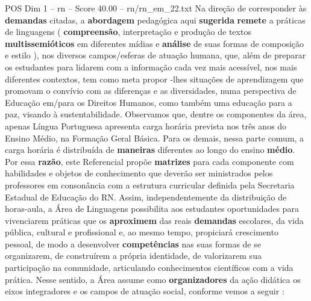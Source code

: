 \begin{textsample}{POS Dim 1 – rn – Score 40.00 – rn/rn\_em\_22.txt}
Na direção de corresponder às \textbf{demandas} citadas, a \textbf{abordagem} pedagógica aqui \textbf{sugerida} \textbf{remete} a práticas de linguagens ( \textbf{compreensão}, interpretação e produção de textos \textbf{multissemióticos} em diferentes mídias e \textbf{análise} de suas formas de composição e estilo ), nos diversos campos/esferas de atuação humana, que, além de preparar os estudantes para lidarem com a informação cada vez mais acessível, nos mais diferentes contextos, tem como meta propor -lhes situações de aprendizagem que promovam o convívio com as diferenças e as diversidades, numa perspectiva de Educação em/para os Direitos Humanos, como também uma educação para a paz, visando à sustentabilidade.
Observamos que, dentre os componentes da área, apenas Língua Portuguesa apresenta carga horária prevista nos três anos do Ensino Médio, na Formação Geral Básica.
Para os demais, nessa parte comum, a carga horária é distribuída de \textbf{maneiras} diferentes ao longo do ensino \textbf{médio}.
Por essa \textbf{razão}, este Referencial propõe \textbf{matrizes} para cada componente com habilidades e objetos de conhecimento que deverão ser ministrados pelos professores em consonância com a estrutura curricular definida pela Secretaria Estadual de Educação do RN.
Assim, independentemente da distribuição de horas-aula, a Área de Linguagens possibilita aos estudantes oportunidades para vivenciarem práticas que os \textbf{aproximem} das reais \textbf{demandas} escolares, da vida pública, cultural e profissional e, ao mesmo tempo, propiciará crescimento pessoal, de modo a desenvolver \textbf{competências} nas suas formas de se organizarem, de construírem a própria identidade, de valorizarem sua participação na comunidade, articulando conhecimentos científicos com a vida prática.
Nesse sentido, a Área assume como \textbf{organizadores} da ação didática os eixos integradores e os campos de atuação social, conforme vemos a seguir :

\end{textsample}
